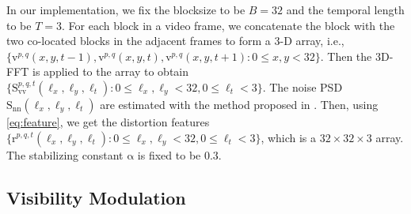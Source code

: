 \documentclass{sig-alternate}
\begin{document}
In our implementation, we fix the blocksize to be $B=32$ and the temporal length to be $T=3$. For each block in a video frame, we concatenate the block with the two co-located blocks in the adjacent frames to form a 3-D array, i.e., $\{\mathrm{v}^{p,q}(x,y,t-1),\mathrm{v}^{p,q}(x,y,t),\mathrm{v}^{p,q}(x,y,t+1): 0\leq x,y<32\}$. Then the 3D-FFT is applied to the array to obtain $\{\mathrm{S}_\mathrm{vv}^{p,q,t}(\ell_x,\ell_y,\ell_t):0\leq\ell_x,\ell_y<32,0\leq\ell_t<3\}$. The noise PSD $\mathrm{S_{nn}}(\ell_x,\ell_y,\ell_t)$ are estimated with the method proposed in \cite{KokKelDenCra2016}. Then, using \eqref{eq:feature}, we get the distortion features $\{\mathrm{r}^{p,q,t}(\ell_x,\ell_y,\ell_t):0\leq \ell_x,\ell_y < 32, 0\leq \ell_t<3\}$, which is a $32\times32\times3$ array. The stabilizing constant $\mathrm{\alpha}$ is fixed to be $0.3$.
\subsection{Visibility Modulation}
\end{document}
